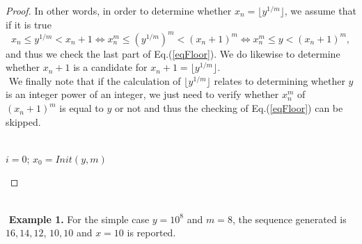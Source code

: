 \documentclass[11pt]{article}
\newcommand{\floor}[1]{\lfloor #1 \rfloor}
\begin{document}
\begin{proof}
In other words, in order to determine whether $x_n = \floor{y^{1/m}}$,
we assume that if it is true
\begin{equation}
\label{eqFloor}
x_n \leq  y^{1/m} < x_n +1
\Leftrightarrow
x_n^m \leq  \left( y^{1/m}\right)^m < \left( x_n +1 \right)^m
\Leftrightarrow
x_n^m \leq  y  < \left( x_n +1 \right)^m ,
\end{equation}
and thus we check the last part of Eq.(\ref{eqFloor}).
We do likewise to determine whether  $x_n +1$ is a candidate for 
$x_n + 1 = \floor{y^{1/m}}$.
$ $ \\ $ $
We finally note that if the calculation of $\floor{y^{1/m}}$
relates to determining whether $y$
is an integer power of an integer, we just need to
verify whether $x_n^m$ of $(x_n +1)^m$ is equal to $y$ or not
and thus the checking of Eq.(\ref{eqFloor}) can be skipped.
$ $ \\ $ $


\begin{algorithm}[H]


 $i=0$;
 $x_0 = Init(y,m)$  



 \caption{FindFloor(y,m) : Find $\lfloor y^{1/m} \rfloor$}
 \label{F1}
\end{algorithm}
\end{proof}

$ $ \\ $ $
{\bf Example 1.}
For the simple case $y=10^8$ and $m=8$,
the sequence generated is $16, 14, 12$, $10, 10$ and
$x=10$ is reported.
\end{document}
